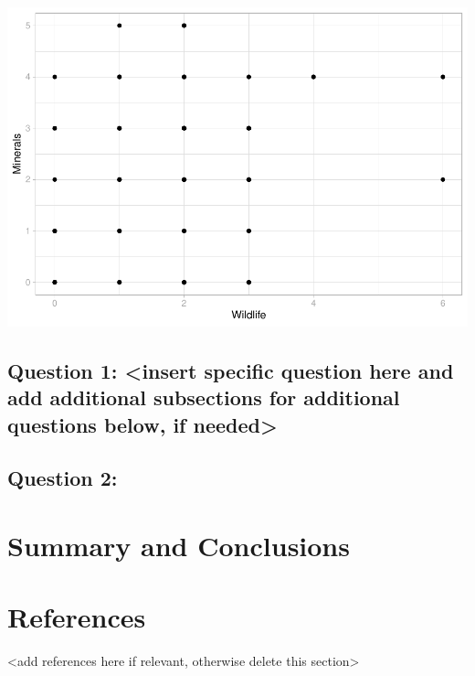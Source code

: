 \documentclass[
  12pt,
]{article}
\begin{document}
\includegraphics{FinalProject_Myers_files/figure-latex/unnamed-chunk-11-1.pdf}

\hypertarget{question-1-insert-specific-question-here-and-add-additional-subsections-for-additional-questions-below-if-needed}{%
\subsection{Question 1: \textless insert specific question here and add
additional subsections for additional questions below, if
needed\textgreater{}}\label{question-1-insert-specific-question-here-and-add-additional-subsections-for-additional-questions-below-if-needed}}

\hypertarget{question-2}{%
\subsection{Question 2:}\label{question-2}}

\newpage

\hypertarget{summary-and-conclusions}{%
\section{Summary and Conclusions}\label{summary-and-conclusions}}

\newpage

\hypertarget{references}{%
\section{References}\label{references}}

\textless add references here if relevant, otherwise delete this
section\textgreater{}
\end{document}
